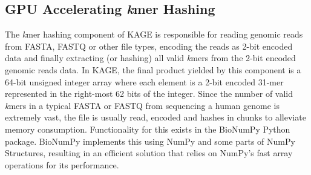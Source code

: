\subsection{GPU Accelerating \textit{k}mer Hashing} \label{methods:gpu_accelerating_kmer_hashing}
The \textit{k}mer hashing component of KAGE is responsible for reading genomic reads from FASTA, FASTQ or other file types, encoding the reads as 2-bit encoded data and finally extracting (or hashing) all valid \textit{k}mers from the 2-bit encoded genomic reads data.
In KAGE, the final product yielded by this component is a 64-bit unsigned integer array where each element is a 2-bit encoded 31-mer represented in the right-most 62 bits of the integer.
Since the number of valid \textit{k}mers in a typical FASTA or FASTQ from sequencing a human genome is extremely vast, the file is usually read, encoded and hashes in chunks to alleviate memory consumption.
Functionality for this exists in the BioNumPy Python package.
BioNumPy implements this using NumPy and some parts of NumPy Structures, resulting in an efficient solution that relies on NumPy's fast array operations for its performance.
